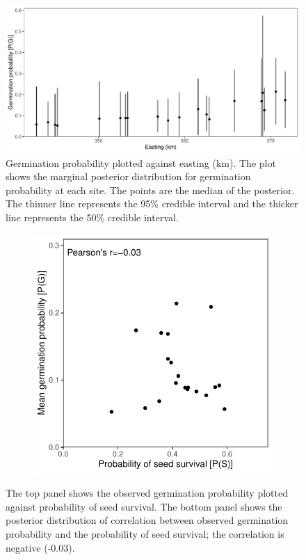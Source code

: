 \documentclass[12pt, oneside, titlepage]{article}   	%
\begin{document}
 \begin{figure}[h]
   \centering
       \includegraphics[page=1,width=1\textwidth]{../figures/spatial-g1.pdf}  
    \caption{ Germination probability plotted against easting (km). The plot shows the marginal posterior distribution for germination probability at each site. The points are the median of the posterior. The thinner line represents the 95\% credible interval and the thicker line represents the 50\% credible interval. }
 \label{fig:test}
\end{figure}

 \begin{figure}
\centering
\begin{subfigure}[h]{.65\textwidth}
\centering
       \includegraphics[page=1,width=1\textwidth]{../figures/germ_surv_correlation.pdf}  
\end{subfigure}
 \caption{ The top panel shows the observed germination probability plotted against probability of seed survival. The bottom panel shows the posterior distribution of correlation between observed germination probability and the probability of seed survival; the correlation is negative (-0.03). }
  \label{fig:germ_surv_correlation}
 \end{figure}
 
\end{document}
